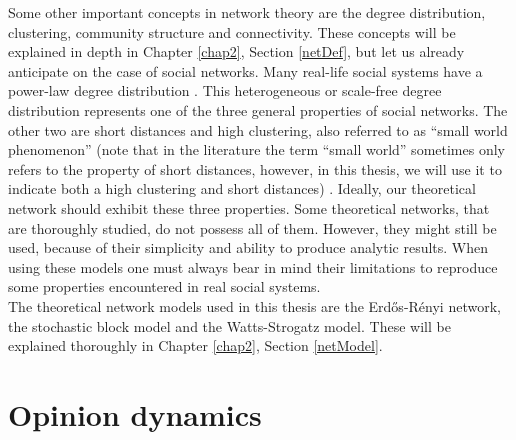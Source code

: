 \documentclass[11 pt , letterpaper , twoside , openright]{book}
\begin{document}
\newline
Some other important concepts in network theory are the degree distribution, clustering, community structure and connectivity. These concepts will be explained in depth in Chapter \ref{chap2}, Section \ref{netDef}, but let us already anticipate on the case of social networks. Many real-life social systems have a power-law degree distribution \cite{Muchnik2013}. This heterogeneous or scale-free degree distribution represents one of the three general properties of social networks. The other two are short distances and high clustering, also referred to as ``small world phenomenon'' (note that in the literature the term ``small world'' sometimes only refers to the property of short distances, however, in this thesis, we will use it to indicate both a high clustering and short distances) \cite{Muchnik2013}. Ideally, our theoretical network should exhibit these three properties. Some theoretical networks, that are thoroughly studied, do not possess all of them. However, they might still be used, because of their simplicity and ability to produce analytic results. When using these models one must always bear in mind their limitations to reproduce some properties encountered in real social systems. \\
\newline
The theoretical network models used in this thesis are the Erd\H{o}s-R\'{e}nyi network, the stochastic block model and the Watts-Strogatz model. These will be explained thoroughly in Chapter \ref{chap2}, Section \ref{netModel}. 

\section{Opinion dynamics}\label{Opinion}
\end{document}
